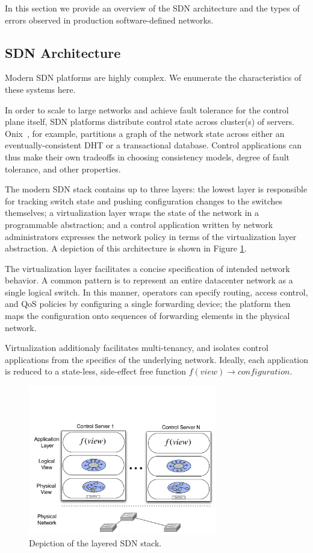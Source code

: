 In this section we provide an overview of the SDN architecture and the types
of errors observed in production software-defined networks.

\subsection{SDN Architecture}

Modern SDN platforms are highly complex. We enumerate the characteristics of
these systems here.

In order to scale to large networks and achieve fault tolerance for the control
plane itself, SDN platforms distribute control state across cluster(s) of servers.
Onix~\cite{onix}, for example,
partitions a graph of the network state across either an eventually-consistent
DHT or a transactional database. Control applications can thus make their own
tradeoffs in choosing consistency models, degree of
fault tolerance, and other properties.

The modern SDN stack contains up to three layers: the lowest
layer is responsible for tracking switch state and pushing configuration
changes to the switches themselves; a virtualization layer
wraps the state of the network in a programmable abstraction; and a control
application written by network administrators 
expresses the network policy in terms of the virtualization layer abstraction.
A depiction of this architecture is shown in Figure \ref{fig:basicarch}.

The virtualization layer facilitates a concise specification of
intended network behavior. A common pattern is to represent an entire
datacenter network as a single logical switch. In this manner, operators
can specify routing, access control, and QoS policies by configuring a single forwarding
device; the platform then maps the configuration onto sequences 
of forwarding elements in the physical network.

Virtualization additionaly facilitates multi-tenancy, and isolates control applications from the specifics
of the underlying network. Ideally, each application is reduced to a
state-less, side-effect free function $f(view) \rightarrow configuration$.

\begin{figure}[t]
    \includegraphics[width=3.25in]{../diagrams/architecture/SDN_stack.pdf}
    \caption[]{\label{fig:basicarch} Depiction of the layered SDN stack.} 
\end{figure}

